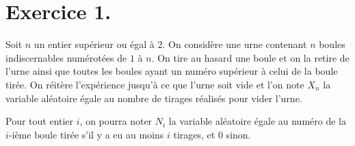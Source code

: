 \documentclass[a4paper,french,bookmarks]{article}
\begin{document}
    
    \section*{Exercice 1.}
    
    Soit $n$ un entier supérieur ou égal à $2$. On considère une urne contenant $n$ boules indiscernables numérotées de $1$ à $n$. On tire au hasard une boule et on la retire de l'urne ainsi que toutes les boules ayant un numéro supérieur à celui de la boule tirée. On réitère l'expérience jusqu'à ce que l'urne soit vide et l'on note $X_n$ la variable aléatoire égale au nombre de tirages réalisés pour vider l'urne.\medskip
    
    Pour tout entier $i$, on pourra noter $N_i$ la variable aléatoire égale au numéro de la $i$-ième boule tirée s'il y a eu au moins $i$ tirages, et $0$ sinon.
    
\end{document}
